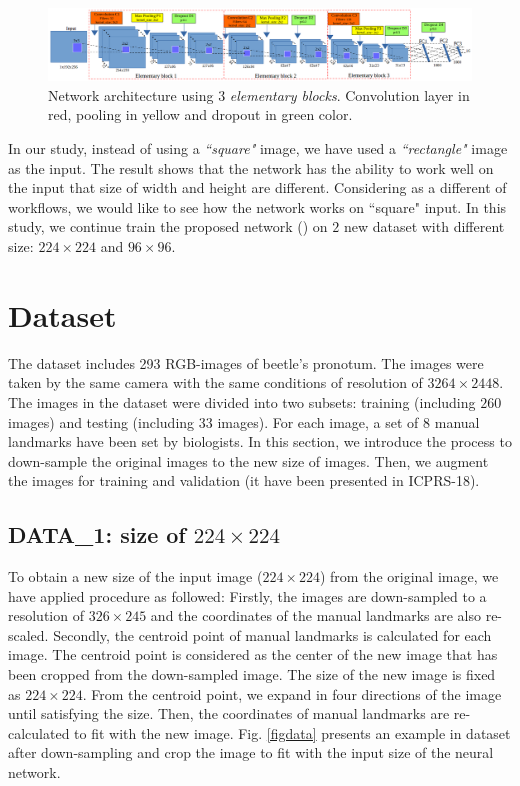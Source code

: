 \documentclass[12pt,a4paper]{article}
\begin{document}
\begin{figure}[h]
\centering
\includegraphics[scale=0.32]{images/cnn_newdatasize/arch_model}
\caption{{\small{Network architecture using $3$ \textit{elementary blocks}.
  Convolution
  layer in red, pooling in yellow and dropout in green color.}}} 
\label{cnnnetwork2}
\end{figure}

In our study, instead of using a \textit{``square"} image, we have used a \textit{``rectangle"} image as the input. The result shows that the network has the ability to work well on the input that size of width and height are different. Considering as a different of workflows, we would like to see how the network works on ``square" input. In this study, we continue train the proposed network () on $2$ new dataset with different size: $224 \times 224$ and $96 \times 96$.

\section{Dataset}
The dataset includes 293 RGB-images of beetle's pronotum. The images were taken by the same camera with the same conditions of resolution of $3264 \times 2448$. The images in the dataset were divided into two subsets: training (including $260$ images) and testing (including $33$ images). For each image, a set of 8 manual landmarks have been set by biologists.
In this section, we introduce the process to down-sample the original images to the new size of images. Then, we augment the images for training and validation (it have been presented in ICPRS-18).
\subsection{DATA\_1: size of $224 \times 224$}
To obtain a new size of the input image ($224 \times 224$) from the original image, we have applied procedure as followed: Firstly, the images are down-sampled to a resolution of $326 \times 245$ and the coordinates of the manual landmarks are also re-scaled. Secondly, the centroid point of manual landmarks is calculated for each image. The centroid point is considered as the center of the new image that has been cropped from the down-sampled image. The size of the new image is fixed as $224 \times 224$. From the centroid point, we expand in four directions of the image until satisfying the size. Then, the coordinates of manual landmarks are re-calculated to fit with the new image. Fig. \ref{figdata} presents an example in dataset after down-sampling and crop the image to fit with the input size of the neural network.
\end{document}
